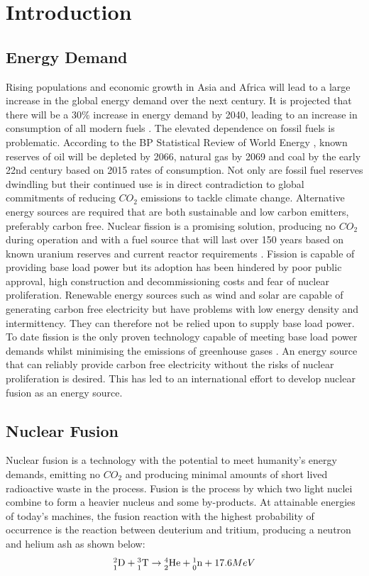 	\section{Introduction}
	\subsection{Energy Demand}
	Rising populations and economic growth in Asia and Africa will lead to a  large increase in the global energy demand over the next century. It is projected that there will be a 30$\%$ increase in energy demand by 2040, leading to an increase in consumption of all modern fuels \cite{outlook2016}. The elevated dependence on fossil fuels is problematic. According to the BP Statistical Review of World Energy \cite{BP}, known reserves of oil will be depleted by 2066, natural gas by 2069 and coal by the early 22nd century based on 2015 rates of consumption. Not only are fossil fuel reserves dwindling but their continued use is in direct contradiction to global commitments of reducing $CO_2$ emissions to tackle climate change. Alternative energy sources are required that are both sustainable and low carbon emitters, preferably carbon free. Nuclear fission is a promising solution, producing no $CO_2$ during operation and with a fuel source that will last over 150 years based on known uranium reserves and current reactor requirements \cite{uranium}. Fission is capable of providing base load power but its adoption has been hindered by poor public approval, high construction and decommissioning costs and fear of nuclear proliferation. Renewable energy sources such as wind and solar are capable of generating carbon free electricity but have problems with low energy density and intermittency. They can therefore not be relied upon to supply base load power. To date fission is the only proven technology capable of meeting base load power demands whilst minimising the emissions of greenhouse gases \cite{fission}. An energy source that can reliably provide carbon free electricity without the risks of nuclear proliferation is desired. This has led to an international effort to develop nuclear fusion as an energy source. 
	\subsection{Nuclear Fusion}
	Nuclear fusion is a technology with the potential to meet humanity's energy demands, emitting no $CO_2$ and producing minimal amounts of short lived radioactive waste in the process. Fusion is the process by which two light nuclei combine to form a heavier nucleus and some by-products. At attainable energies of today's machines, the fusion reaction with the highest probability of occurrence is the reaction between deuterium and tritium, producing a neutron and helium ash as shown below: 
	\begin{equation}
	\nucl{2}{1}{D} + \nucl{3}{1}{T} \to \nucl{4}{2}{He} + \nucl{1}{0}{n} +17.6MeV
	\end{equation}
	
